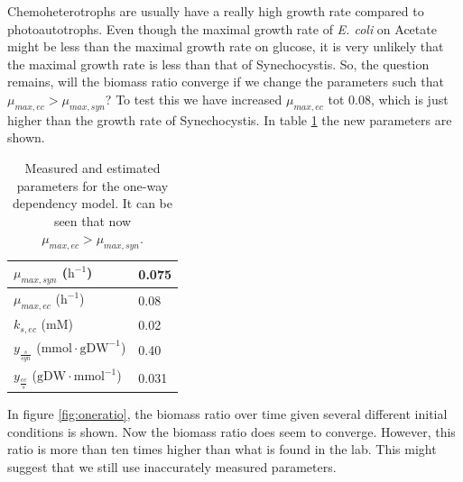 \documentclass[12pt]{report}
\begin{document}
Chemoheterotrophs are usually have a really high growth rate compared to photoautotrophs. Even though the maximal growth rate of \textit{E. coli} on Acetate might be less than the maximal growth rate on glucose, it is very unlikely that the maximal growth rate is less than that of Synechocystis. So, the question remains, will the biomass ratio converge if we change the parameters such that $\mu_{max,ec} > \mu_{max,syn}$?
To test this we have increased $\mu_{max,ec}$ tot 0.08, which is just higher than the growth rate of Synechocystis. In table \ref{tab:oh} the new parameters are shown.

\begin{table}[!ht]
 \begin{center}  
  \begin{tabular}{|l|l|}
   \hline
   $\mu_{max,syn}$ ($\text{h}^{-1}$) & 0.075 \\ \hline
   $\mu_{max,ec}$ ($\text{h}^{-1}$) & 0.08 \\ \hline
   $k_{s,ec}$ ($\text{mM}$) & 0.02 \\ \hline
   $y_{\frac{s}{syn}}$ ($\text{mmol}\cdot\text{gDW}^{-1}$) & 0.40 \\ \hline
   $y_{\frac{ec}{s}}$ ($\text{gDW}\cdot\text{mmol}^{-1}$) & 0.031 \\
   \hline   
  \end{tabular}
  \caption{Measured and estimated parameters for the one-way dependency model. It can be seen that now $\mu_{max,ec} > \mu_{max,syn}$.}
  \label{tab:oh}
 \end{center}
\end{table}

In figure \ref{fig:oneratio}, the biomass ratio over time given several different initial conditions is shown. Now the biomass ratio does seem to converge. However, this ratio is more than ten times higher than what is found in the lab. This might suggest that we still use inaccurately measured parameters. 
\end{document}
